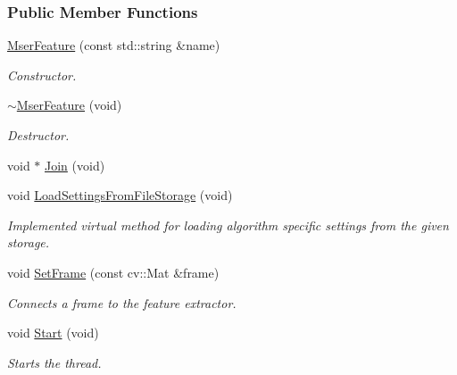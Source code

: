 \subsubsection*{Public Member Functions}
\begin{DoxyCompactItemize}
\item 
\hyperlink{group___feature_extractor_aebc805ab0c031d159521b3fa0ae3a5b2}{Mser\-Feature} (const std\-::string \&name)
\begin{DoxyCompactList}\small\item\em Constructor. \end{DoxyCompactList}\item 
\hyperlink{group___feature_extractor_a4cf98957c8813b3ec26641ded124340d}{$\sim$\-Mser\-Feature} (void)
\begin{DoxyCompactList}\small\item\em Destructor. \end{DoxyCompactList}\item 
void $\ast$ \hyperlink{group___core_a8f33f7750321d5df9188033e7e3e300d}{Join} (void)
\item 
void \hyperlink{group___feature_extractor_ae6c9bca2395a33ecac78a46e9c331979}{Load\-Settings\-From\-File\-Storage} (void)
\begin{DoxyCompactList}\small\item\em Implemented virtual method for loading algorithm specific settings from the given storage. \end{DoxyCompactList}\item 
void \hyperlink{group___feature_extractor_af261b9c5cac5ff1fb628317c7009c845}{Set\-Frame} (const cv\-::\-Mat \&frame)
\begin{DoxyCompactList}\small\item\em Connects a frame to the feature extractor. \end{DoxyCompactList}\item 
void \hyperlink{group___core_a2b42f82341afd2747ea093b6ac8b91cb}{Start} (void)
\begin{DoxyCompactList}\small\item\em Starts the thread. \end{DoxyCompactList}\end{DoxyCompactItemize}
